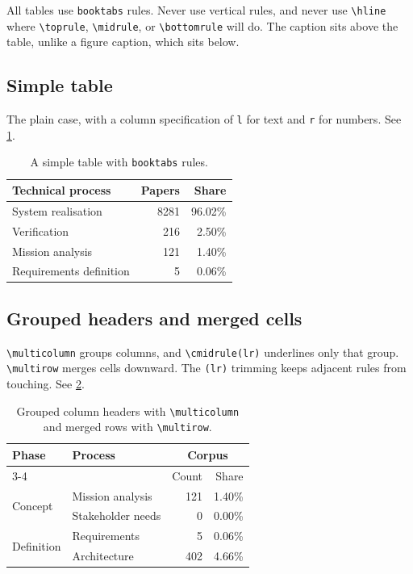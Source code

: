 All tables use \verb|booktabs| rules.
Never use vertical rules, and never use \verb|\hline| where \verb|\toprule|, \verb|\midrule|, or \verb|\bottomrule| will do.
The caption sits above the table, unlike a figure caption, which sits below.

\subsection{Simple table}
The plain case, with a column specification of \verb|l| for text and \verb|r| for numbers.
See \cref{tab:simple}.

\begin{table}[t]
  \centering
  \caption{A simple table with \texttt{booktabs} rules.}
  \label{tab:simple}
  \begin{tabular}{lrr}
    \toprule
    Technical process & Papers & Share \\
    \midrule
    System realisation      & 8281 & 96.02\% \\
    Verification            &  216 &  2.50\% \\
    Mission analysis        &  121 &  1.40\% \\
    Requirements definition &    5 &  0.06\% \\
    \bottomrule
  \end{tabular}
\end{table}

\subsection{Grouped headers and merged cells}
\verb|\multicolumn| groups columns, and \verb|\cmidrule(lr)| underlines only that group.
\verb|\multirow| merges cells downward.
The \verb|(lr)| trimming keeps adjacent rules from touching.
See \cref{tab:grouped}.

\begin{table}[t]
  \centering
  \caption{Grouped column headers with \texttt{\textbackslash multicolumn} and merged rows with \texttt{\textbackslash multirow}.}
  \label{tab:grouped}
  \begin{tabular}{llrr}
    \toprule
    \multirow{2}{*}{Phase} & \multirow{2}{*}{Process}
      & \multicolumn{2}{c}{Corpus} \\
    \cmidrule(lr){3-4}
      & & Count & Share \\
    \midrule
    \multirow{2}{*}{Concept}
      & Mission analysis   & 121 & 1.40\% \\
      & Stakeholder needs  &   0 & 0.00\% \\
    \midrule
    \multirow{2}{*}{Definition}
      & Requirements       &   5 & 0.06\% \\
      & Architecture       & 402 & 4.66\% \\
    \bottomrule
  \end{tabular}
\end{table}

